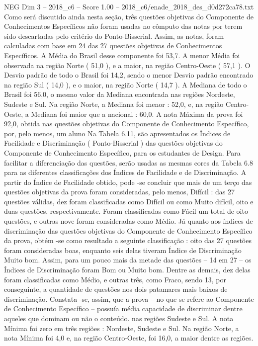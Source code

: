 \begin{textsample}{NEG Dim 3 – 2018\_c6 – Score 1.00 – 2018\_c6/enade\_2018\_des\_d0d272ca78.txt}
Como será discutido ainda nesta seção, três questões objetivas do Componente de Conhecimentos Específicos não foram usadas no cômputo das notas por terem sido descartadas pelo critério do Ponto-Bisserial.
Assim, as notas, foram calculadas com base em 24 das 27 questões objetivas de Conhecimentos Específicos.
A Média do Brasil desse componente foi 53,7.
A menor Média foi observada na região Norte ( 51,0 ), e a maior, na região Centro-Oeste ( 57,1 ).
O Desvio padrão de todo o Brasil foi 14,2, sendo o menor Desvio padrão encontrado na região Sul ( 14,0 ), e o maior, na região Norte ( 14,7 ).
A Mediana de todo o Brasil foi 56,0, o mesmo valor da Mediana encontrada nas regiões Nordeste, Sudeste e Sul.
Na região Norte, a Mediana foi menor : 52,0, e, na região Centro-Oeste, a Mediana foi maior que a nacional : 60,0.
A nota Máxima da prova foi 92,0, obtida nas questões objetivas do Componente de Conhecimento Específico, por, pelo menos, um aluno Na Tabela 6.11, são apresentados os Índices de Facilidade e Discriminação ( Ponto-Bisserial ) das questões objetivas do Componente de Conhecimento Específico, para os estudantes de Design.
Para facilitar a diferenciação das questões, serão usadas as mesmas cores da Tabela 6.8 para as diferentes classificações dos Índices de Facilidade e de Discriminação.
A partir do Índice de Facilidade obtido, pode -se concluir que mais de um terço das questões objetivas da prova foram consideradas, pelo menos, Difícil : das 27 questões válidas, dez foram classificadas como Difícil ou como Muito difícil, oito e duas questões, respectivamente.
Foram classificadas como Fácil um total de oito questões, e outras nove foram consideradas como Médio.
Já quanto aos índices de discriminação das questões objetivas do Componente de Conhecimento Específico da prova, obtém -se como resultado a seguinte classificação : oito das 27 questões foram consideradas boas, enquanto seis delas tiveram Índice de Discriminação Muito bom.
Assim, para um pouco mais da metade das questões – 14 em 27 – os Índices de Discriminação foram Bom ou Muito bom.
Dentre as demais, dez delas foram classificadas como Médio, e outras três, como Fraco, sendo 13, por conseguinte, a quantidade de questões nos dois patamares mais baixos de discriminação.
Constata -se, assim, que a prova – no que se refere ao Componente de Conhecimento Específico – possuía média capacidade de discriminar dentre aqueles que dominam ou não o conteúdo. nas regiões Sudeste e Sul.
A nota Mínima foi zero em três regiões : Nordeste, Sudeste e Sul.
Na região Norte, a nota Mínima foi 4,0 e, na região Centro-Oeste, foi 16,0, a maior dentre as regiões.

\end{textsample}
